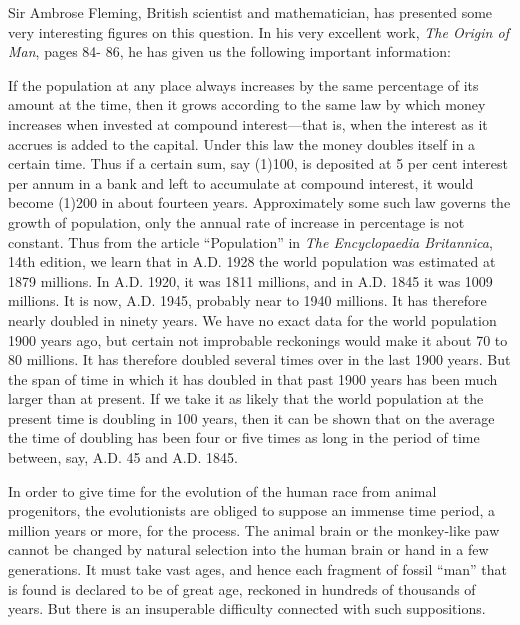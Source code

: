 Sir Ambrose Fleming, British scientist and mathematician, has presented some very
interesting figures on this question. In his very excellent work, \textit{The Origin of Man}, pages 84-
86, he has given us the following important information:

If the population at any place always increases by the same percentage of its amount at the
time, then it grows according to the same law by which money increases when invested at
compound interest—that is, when the interest as it accrues is added to the capital. Under this
law the money doubles itself in a certain time. Thus if a certain sum, say (1)100, is deposited
at 5 per cent interest per annum in a bank and left to accumulate at compound interest, it
would become (1)200 in about fourteen years. Approximately some such law governs the
growth of population, only the annual rate of increase in percentage is not constant. Thus
from the article ``Population'' in \textit{The Encyclopaedia Britannica}, 14th edition, we learn that in
A.D. 1928 the world population was estimated at 1879 millions. In A.D. 1920, it was 1811
millions, and in A.D. 1845 it was 1009 millions. It is now, A.D. 1945, probably near to 1940
millions. It has therefore nearly doubled in ninety years. We have no exact data for the world
population 1900 years ago, but certain not improbable reckonings would make it about 70 to
80 millions. It has therefore doubled several times over in the last 1900 years. But the span of
time in which it has doubled in that past 1900 years has been much larger than at present. If
we take it as likely that the world population at the present time is doubling in 100 years,
then it can be shown that on the average the time of doubling has been four or five times as
long in the period of time between, say, A.D. 45 and A.D. 1845.

In order to give time for the evolution of the human race from animal progenitors, the
evolutionists are obliged to suppose an immense time period, a million years or more, for the
process. The animal brain or the monkey-like paw cannot be changed by natural selection
into the human brain or hand in a few generations. It must take vast ages, and hence each
fragment of fossil ``man'' that is found is declared to be of great age, reckoned in hundreds of
thousands of years. But there is an insuperable difficulty connected with such suppositions.

